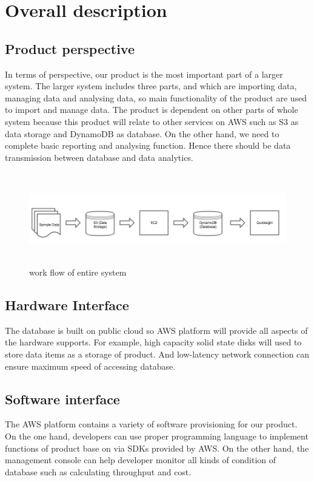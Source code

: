 \section{Overall description}
	\subsection{Product perspective}
        In terms of perspective, our product is the most important part of a larger system. The larger system includes three parts, and which are importing data, managing data and analysing data, so main functionality of the product are used to import and manage data. The product is dependent on other parts of whole system because this product will relate to other services on AWS such as S3 as data storage and DynamoDB as database. On the other hand, we need to complete basic reporting and analysing function. Hence there should be data transmission between database and data analytics.
        
        \begin{figure}[h]
        \includegraphics[width=18cm, height=4cm]{work_flow.png}
        \centering
        \caption{work flow of entire system}
        \end{figure}
        
	\subsection{Hardware Interface} 
       The database is built on public cloud so AWS platform will provide all aspects of the hardware supports. For example, high capacity solid state disks will used to store data items as a storage of product. And low-latency network connection can ensure maximum speed of accessing database.

	\subsection{Software interface}
        The AWS platform contains a variety of software provisioning for our product. On the one hand, developers can use proper programming language to implement functions of product base on via SDKs provided by AWS. On the other hand, the management console can help developer monitor all kinds of condition of database such as calculating throughput and cost. 
       
